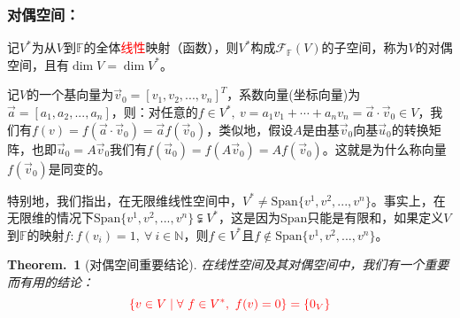 \documentclass[zihao=-4,UTF8]{report}
\theoremstyle{mystyle} %
\newtheorem{theorem}{Theorem.\,}
\begin{document}
\subsubsection{对偶空间：}
记$V^*$为从$V$到$\mathbb{F}$的全体\textcolor{red}{线性}映射（函数），则$V^*$构成$\mathcal{F}_{\mathbb{F}}(V)$的子空间，称为$V$的对偶空间，且有$\dim V = \dim V^*$。\par
{\color{gray}\small 记$V$的一个基向量为$\vec{v}_0 = [v_1,v_2,...,v_n]^T$，系数向量(坐标向量)为$\vec{a} = [a_1,a_2,...,a_n]$，则：对任意的$f \in V^*,\ v = a_1v_1 + \cdots + a_nv_n  = \vec{a}\cdot \vec{v}_0\in V$，我们有$f(v) = f(\vec{a}\cdot \vec{v}_0)= \vec{a}f(\vec{v}_0) $，类似地，假设$A$是由基$\vec{v}_0$向基$\vec{u}_0$的转换矩阵，也即$\vec{u}_0 = A\vec{v}_0$我们有$f(\vec{u}_0) = f(A\vec{v}_0) = Af(\vec{v}_0)$。这就是为什么称向量$f(\vec{v}_0)$是同变的。\par
特别地，我们指出，在无限维线性空间中，$V^* \ne \text{Span} \{v^1,v^2,...,v^n\}$。事实上，在无限维的情况下$\text{Span} \{v^1,v^2,...,v^n\} \subsetneqq V^*$，这是因为$\text{Span}$只能是有限和，如果定义$V$到$\mathbb{F}$的映射$f: f(v_i) = 1,\ \forall\ i \in \mathbb{N}$，则$f \in V^*$且$f \notin \text{Span}\{v^1,v^2,...,v^n\}$。}

\begin{theorem}[对偶空间重要结论]\label{对偶空间重要结论}
    在线性空间及其对偶空间中，我们有一个重要而有用的结论：
    \begin{equation*}
       \textcolor{red}{ \{v \in V \mid \forall\ f \in V^*,\ f(v) = 0\} = \{0_V\}}
    \end{equation*}
\end{theorem}
\end{document}
